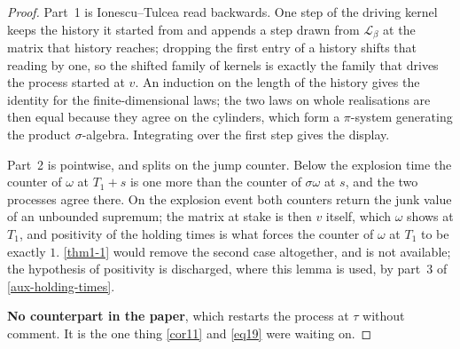 \begin{proof}
  \leanok
  Part~1 is Ionescu--Tulcea read backwards.  One step of the driving kernel
  keeps the history it started from and appends a step drawn from
  $\mathcal{L}_\beta$ at the matrix that history reaches; dropping the first
  entry of a history shifts that reading by one, so the shifted family of
  kernels is exactly the family that drives the process started at $v$.  An
  induction on the length of the history gives the identity for the
  finite-dimensional laws; the two laws on whole realisations are then equal
  because they agree on the cylinders, which form a $\pi$-system generating the
  product $\sigma$-algebra.  Integrating over the first step gives the display.

  Part~2 is pointwise, and splits on the jump counter.  Below the explosion
  time the counter of $\omega$ at $T_1 + s$ is one more than the counter of
  $\sigma\omega$ at $s$, and the two processes agree there.  On the explosion
  event both counters return the junk value of an unbounded supremum; the
  matrix at stake is then $v$ itself, which $\omega$ shows at $T_1$, and
  positivity of the holding times is what forces the counter of $\omega$ at
  $T_1$ to be exactly $1$.  \ref{thm1-1} would remove the second case
  altogether, and is not available; the hypothesis of positivity is discharged,
  where this lemma is used, by part~3 of \ref{aux-holding-times}.

  \textbf{No counterpart in the paper}, which restarts the process at $\tau$
  without comment.  It is the one thing \ref{cor11} and \ref{eq19} were waiting
  on.
\end{proof}

